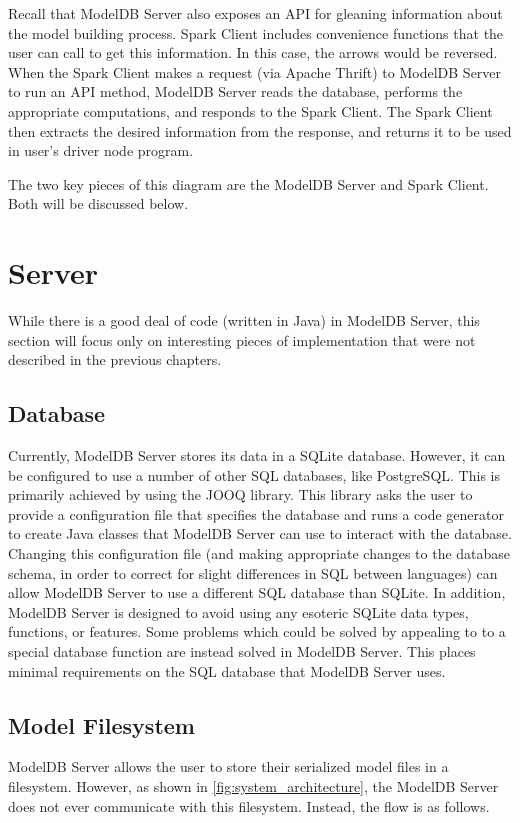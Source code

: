 Recall that ModelDB Server also exposes an API for gleaning information about the model building process.
Spark Client includes convenience functions that the user can call to get this information. In this case,
the arrows would be reversed. When the Spark Client makes a request (via Apache Thrift) to ModelDB Server to run an API 
method, ModelDB Server reads the database, performs the appropriate computations, and responds to the Spark Client. The
Spark Client then extracts the desired information from the response, and returns it to be used in user's driver node
program.

The two key pieces of this diagram are the ModelDB Server and Spark Client. Both
will be discussed below.

\section{Server}
While there is a good deal of code (written in Java) in ModelDB Server, this section will focus only
on interesting pieces of implementation that were not described in the previous chapters.

\subsection{Database}
Currently, ModelDB Server stores its data in a SQLite database. However, it can be
configured to use a number of other SQL databases, like PostgreSQL. This is primarily
achieved by using the JOOQ library. This library asks the user to provide a configuration
file that specifies the database and runs a code generator to create Java classes that
ModelDB Server can use to interact with the database. Changing this configuration file
(and making appropriate changes to the database schema, in order to correct for slight differences
in SQL between languages) can allow ModelDB Server to use a different SQL database than
SQLite. In addition, ModelDB Server is designed to avoid using any esoteric SQLite data types,
functions, or features. Some problems which could be solved by appealing to to a special 
database function are instead solved in ModelDB Server. This places minimal requirements on 
the SQL database that ModelDB Server uses.

\subsection{Model Filesystem}
ModelDB Server allows the user to store their serialized model files in a filesystem. However,
as shown in \ref{fig:system_architecture}, the ModelDB Server does not ever communicate with this
filesystem. Instead, the flow is as follows.

